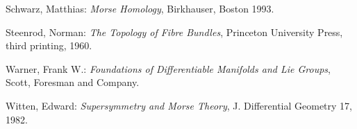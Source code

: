 \documentclass[12pt]{book}
\begin{document}
\begin{thebibliography}{9}
		Schwarz, Matthias:
		\emph{Morse Homology},
		Birkhauser, Boston
		1993.
		
		Steenrod, Norman:
		\emph{The Topology of Fibre Bundles},
		Princeton University Press, third printing, 
		1960.
		
		Warner, Frank W.:
		\emph{Foundations of Differentiable Manifolds and Lie Groups},
		Scott, Foresman and Company.
			
		Witten, Edward:
		\emph{Supersymmetry and Morse Theory},
		J. Differential Geometry 17,
		1982.
	\end{thebibliography}
	
\end{document}

